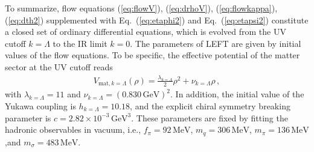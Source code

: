 \documentclass[%
reprint,
superscriptaddress,
showpacs,preprintnumbers,
 amsmath,amssymb,
 aps,
prd,
]{revtex4-1}
\def\Eq#1{Eq.~(\ref{#1})}
\begin{document}
To summarize, flow equations (\ref{eq:flowV}), (\ref{eq:drhoV}), (\ref{eq:flowkappa}), (\ref{eq:dth2}) supplemented with \Eq{eq:etaphi2} and \Eq{eq:etapsi2} constitute a closed set of ordinary differential equations, which is evolved from the UV cutoff $k=\Lambda$ to the IR limit $k=0$. The parameters of LEFT are given by initial values of the flow equations. To be specific, the effective potential of the matter sector at the UV cutoff reads
\begin{align}
  V_{\mathrm{mat}, k=\Lambda}(\rho)=\frac{\lambda_{k=\Lambda}}{2}\rho^2+\nu_{k=\Lambda}\rho\,,
\end{align}
with $\lambda_{k=\Lambda}=11$ and $\nu_{k=\Lambda}=(0.830\,\mathrm{GeV})^2$. In addition, the initial value of the Yukawa coupling is $h_{k=\Lambda}=10.18$, and the explicit chiral symmetry breaking parameter is $c=2.82\times 10^{-3}\,\mathrm{GeV}^3$. These parameters are fixed by fitting the hadronic observables in vacuum, i.e., $f_\pi=92\,\mathrm{MeV}$, $m_q=306\,\mathrm{MeV}$, $m_\pi=136\,\mathrm{MeV}$,and $m_\sigma=483\,\mathrm{MeV}$.





\end{document}

